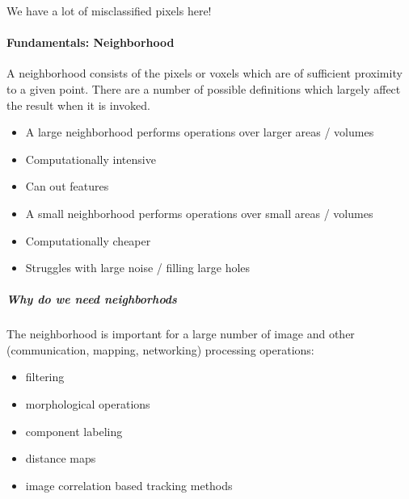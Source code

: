 \documentclass[letterpaper,10pt,english]{sphinxmanual}
\begin{document}
\sphinxAtStartPar
We have a lot of misclassified pixels here!


\paragraph{Fundamentals: Neighborhood}
\label{\detokenize{04-BasicSegmentation_Part2:fundamentals-neighborhood}}
\sphinxAtStartPar
A neighborhood consists of the pixels or voxels which are of sufficient proximity to a given point. There are a number of possible definitions which largely affect the result when it is invoked.
\begin{itemize}
\item {} 
\sphinxAtStartPar
A large neighborhood performs operations over larger areas / volumes

\item {} 
\sphinxAtStartPar
Computationally intensive

\item {} 
\sphinxAtStartPar
Can  out features

\item {} 
\sphinxAtStartPar
A small neighborhood performs operations over small areas / volumes

\item {} 
\sphinxAtStartPar
Computationally cheaper

\item {} 
\sphinxAtStartPar
Struggles with large noise / filling large holes

\end{itemize}


\subparagraph{Why do we need neighborhods}
\label{\detokenize{04-BasicSegmentation_Part2:why-do-we-need-neighborhods}}
\sphinxAtStartPar
The neighborhood is important for a large number of image and other (communication, mapping, networking) processing operations:
\begin{itemize}
\item {} 
\sphinxAtStartPar
filtering

\item {} 
\sphinxAtStartPar
morphological operations

\item {} 
\sphinxAtStartPar
component labeling

\item {} 
\sphinxAtStartPar
distance maps

\item {} 
\sphinxAtStartPar
image correlation based tracking methods

\end{itemize}
\end{document}
